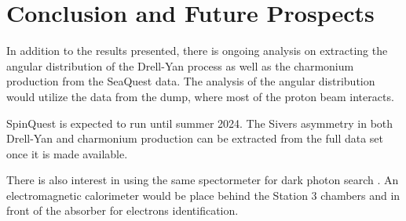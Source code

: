 \documentclass[../main.tex]{subfiles}
\begin{document}
\ifSubfilesClassLoaded{
	\mainmatter
	\setcounter{chapter}{5}
}{}

\chapter{Conclusion and Future Prospects}
\label{ch:conclusion}

In addition to the results presented, there is ongoing analysis on extracting 
the angular distribution of the Drell-Yan process as well as the charmonium 
production from the SeaQuest data. The analysis of the angular distribution would 
utilize the data from the dump, where most of the proton beam interacts.


SpinQuest is expected to run until summer 2024. The Sivers
asymmetry in both Drell-Yan and charmonium production can be extracted from the full
data set once it is made available.

There is also interest in using the same spectormeter for dark photon search
\cite{apyan2022}. An electromagnetic calorimeter would be place behind the 
Station 3 chambers and in front of the absorber for electrons identification.

\ifSubfilesClassLoaded{ \printbibliography[heading=bibintoc,title={References}]}{}
\end{document}
